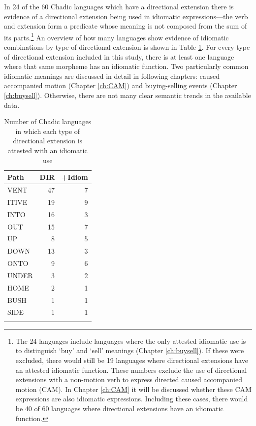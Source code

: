 In 24 of the 60 Chadic languages which have a directional extension there is evidence of a directional extension being used in idiomatic expressions---the verb and extension form a predicate whose meaning is not composed from the sum of its parts.\footnote{The 24 languages include languages where the only attested idiomatic use is to distinguish `buy' and `sell' meanings (Chapter \ref{ch:buysell}). If these were excluded, there would still be 19 languages where directional extensions have an attested idiomatic function. These numbers exclude the use of directional extensions with a non-motion verb to express directed caused accompanied motion (CAM). In Chapter \ref{ch:CAM} it will be discussed whether these CAM expressions are also idiomatic expressions. Including these cases, there would be 40 of 60 languages where directional extensions have an idiomatic function.} An overview of how many languages show evidence of idiomatic combinations by type of directional extension is shown in Table \ref{tab:DIR_lex}. For every type of directional extension included in this study, there is at least one language where that same morpheme has an idiomatic function. Two particularly common idiomatic meanings are discussed in detail in following chapters: caused accompanied motion (Chapter \ref{ch:CAM}) and buying-selling events (Chapter \ref{ch:buysell}). Otherwise, there are not many clear semantic trends in the available data. 

\begin{table}
	\caption{Number of Chadic languages in which each type of directional extension is attested with an idiomatic use}
	\label{tab:DIR_lex}
	\begin{tabular}{lrr} %
		\lsptoprule
      Path &  DIR &  +Idiom \\
\midrule
VENT &   47 &             7 \\
ITIVE &   19 &             9 \\
INTO &   16 &             3 \\
OUT &   15 &             7 \\
UP &    8 &             5 \\
DOWN &   13 &             3 \\
ONTO &    9 &             6 \\
UNDER &    3 &             2 \\
HOME &    2 &             1 \\
BUSH &    1 &             1 \\
SIDE &    1 &             1 \\
		\lspbottomrule
	\end{tabular}
\end{table}

